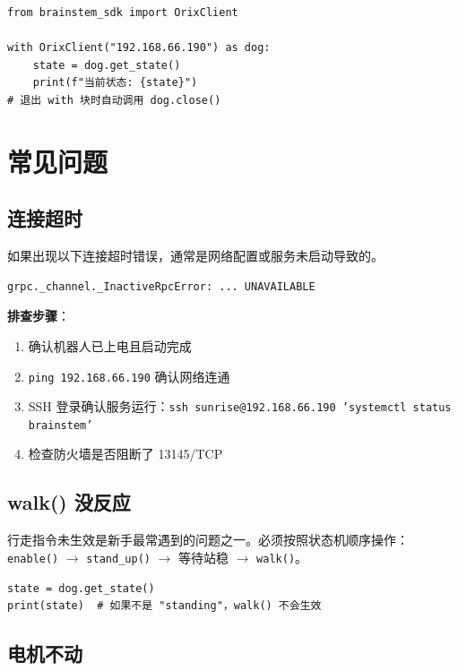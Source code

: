 \documentclass[a4paper,11pt,openany]{book}
\begin{document}
\begin{lstlisting}[style=python]
from brainstem_sdk import OrixClient

with OrixClient("192.168.66.190") as dog:
    state = dog.get_state()
    print(f"当前状态: {state}")
# 退出 with 块时自动调用 dog.close()
\end{lstlisting}

\section{常见问题}

\subsection{连接超时}

如果出现以下连接超时错误，通常是网络配置或服务未启动导致的。

\begin{lstlisting}[style=plain,numbers=none]
grpc._channel._InactiveRpcError: ... UNAVAILABLE
\end{lstlisting}

\noindent\textbf{排查步骤}：
\begin{enumerate}[nosep]
  \item 确认机器人已上电且启动完成
  \item \texttt{ping 192.168.66.190} 确认网络连通
  \item SSH 登录确认服务运行：\texttt{ssh sunrise@192.168.66.190 'systemctl status brainstem'}
  \item 检查防火墙是否阻断了 13145/TCP
\end{enumerate}

\subsection{walk() 没反应}

行走指令未生效是新手最常遇到的问题之一。必须按照状态机顺序操作：\texttt{enable()} $\to$ \texttt{stand\_up()} $\to$ 等待站稳 $\to$ \texttt{walk()}。

\begin{lstlisting}[style=python]
state = dog.get_state()
print(state)  # 如果不是 "standing"，walk() 不会生效
\end{lstlisting}

\subsection{电机不动}
\end{document}
